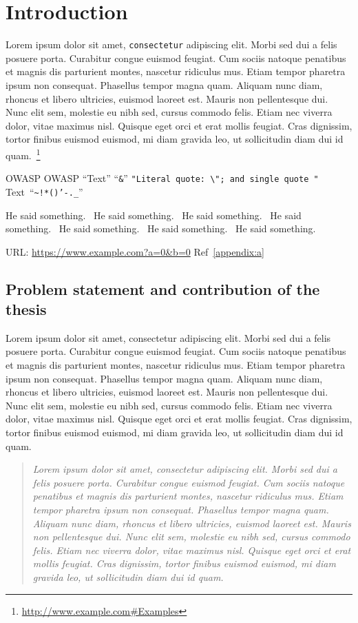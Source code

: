 \chapter{Introduction}
\label{introduction}

Lorem ipsum dolor sit amet, \texttt{consectetur} adipiscing elit. Morbi sed dui a felis posuere porta. Curabitur congue euismod feugiat. Cum sociis natoque penatibus et magnis dis parturient montes, nascetur ridiculus mus. Etiam tempor pharetra ipsum non consequat. Phasellus tempor magna quam. Aliquam nunc diam, rhoncus et libero ultricies, euismod laoreet est. Mauris non pellentesque dui. Nunc elit sem, molestie eu nibh sed, cursus commodo felis. Etiam nec viverra dolor, vitae maximus nisl. Quisque eget orci et erat mollis feugiat. Cras dignissim, tortor finibus euismod euismod, mi diam gravida leo, ut sollicitudin diam dui id quam.~\footnote{\url{http://www.example.com\#Examples}}

\ac{OWASP}
\acf{OWASP}
``Text''
``\texttt{\&}''
\texttt{"Literal quote: \textbackslash{}"; and single quote \apos "}
Text~``\texttt{\textasciitilde!*()'-.\_}''

He said something.~\cite{inproceedings}
He said something.~\cite{techreport}
He said something.~\cite{book}
He said something.~\cite{masterthesis}
He said something.~\cite{article}
He said something.~\cite{misc}
He said something.~\cite{online}

URL: \url{https://www.example.com?a=0&b=0}
Ref~\ref{appendix:a}

\section{Problem statement and contribution of the thesis}
Lorem ipsum dolor sit amet, consectetur adipiscing elit. Morbi sed dui a felis posuere porta. Curabitur congue euismod feugiat. Cum sociis natoque penatibus et magnis dis parturient montes, nascetur ridiculus mus. Etiam tempor pharetra ipsum non consequat. Phasellus tempor magna quam. Aliquam nunc diam, rhoncus et libero ultricies, euismod laoreet est. Mauris non pellentesque dui. Nunc elit sem, molestie eu nibh sed, cursus commodo felis. Etiam nec viverra dolor, vitae maximus nisl. Quisque eget orci et erat mollis feugiat. Cras dignissim, tortor finibus euismod euismod, mi diam gravida leo, ut sollicitudin diam dui id quam.

\begin{quote} %
\emph{
    Lorem ipsum dolor sit amet, consectetur adipiscing elit. Morbi sed dui a felis posuere porta. Curabitur congue euismod feugiat. Cum sociis natoque penatibus et magnis dis parturient montes, nascetur ridiculus mus. Etiam tempor pharetra ipsum non consequat. Phasellus tempor magna quam. Aliquam nunc diam, rhoncus et libero ultricies, euismod laoreet est. Mauris non pellentesque dui. Nunc elit sem, molestie eu nibh sed, cursus commodo felis. Etiam nec viverra dolor, vitae maximus nisl. Quisque eget orci et erat mollis feugiat. Cras dignissim, tortor finibus euismod euismod, mi diam gravida leo, ut sollicitudin diam dui id quam.
}
\end{quote}

